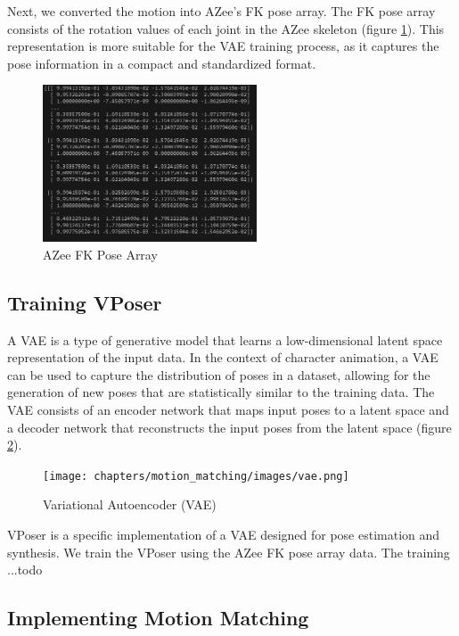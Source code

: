 \documentclass[../../main.tex]{subfiles}
\begin{document}
Next, we converted the motion into AZee's FK pose array. The FK pose array consists of the rotation values of each joint in the AZee skeleton (figure \ref{fig:azee_fk_pose}). This representation is more suitable for the VAE training process, as it captures the pose information in a compact and standardized format.

\begin{figure}
  \centering \includegraphics[width = 2.5in]{chapters/motion_matching/images/azee_fk_pose.png}
  \caption{AZee FK Pose Array}
  \label{fig:azee_fk_pose}
\end{figure}

\subsection{Training VPoser}
\label{ch:motion_matching:motion_matching_with_azee:training}

A VAE is a type of generative model that learns a low-dimensional latent space representation of the input data. In the context of character animation, a VAE can be used to capture the distribution of poses in a dataset, allowing for the generation of new poses that are statistically similar to the training data. The VAE consists of an encoder network that maps input poses to a latent space and a decoder network that reconstructs the input poses from the latent space (figure \ref{fig:vae}).

\begin{figure}
  \centering \texttt{[image: chapters/motion\_matching/images/vae.png]}
  \caption{Variational Autoencoder (VAE)}
  \label{fig:vae}
\end{figure}

VPoser is a specific implementation of a VAE designed for pose estimation and synthesis. We train the VPoser using the AZee FK pose array data. The training ...todo

\subsection{Implementing Motion Matching}
\label{ch:motion_matching:motion_matching_with_azee:implementation}
\end{document}
